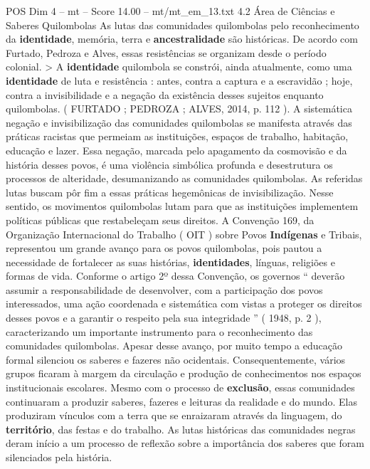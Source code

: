 \begin{textsample}{POS Dim 4 – mt – Score 14.00 – mt/mt\_em\_13.txt}  \label{ex:f4_pos_173}
4.2 Área de Ciências e Saberes Quilombolas As lutas das comunidades quilombolas pelo reconhecimento da \textbf{identidade}, memória, terra e \textbf{ancestralidade} são históricas.
De acordo com Furtado, Pedroza e Alves, essas resistências se organizam desde o período colonial. > A \textbf{identidade} quilombola se constrói, ainda atualmente, como uma \textbf{identidade} de luta e resistência : antes, contra a captura e a escravidão ; hoje, contra a invisibilidade e a negação da existência desses sujeitos enquanto quilombolas. ( FURTADO ; PEDROZA ; ALVES, 2014, p. 112 ).
A sistemática negação e invisibilização das comunidades quilombolas se manifesta através das práticas racistas que permeiam as instituições, espaços de trabalho, habitação, educação e lazer.
Essa negação, marcada pelo apagamento da cosmovisão e da história desses povos, é uma violência simbólica profunda e desestrutura os processos de alteridade, desumanizando as comunidades quilombolas.
As referidas lutas buscam pôr fim a essas práticas hegemônicas de invisibilização.
Nesse sentido, os movimentos quilombolas lutam para que as instituições implementem políticas públicas que restabeleçam seus direitos.
A Convenção 169, da Organização Internacional do Trabalho ( OIT ) sobre Povos \textbf{Indígenas} e Tribais, representou um grande avanço para os povos quilombolas, pois pautou a necessidade de fortalecer as suas histórias, \textbf{identidades}, línguas, religiões e formas de vida.
Conforme o artigo 2º dessa Convenção, os governos “ deverão assumir a responsabilidade de desenvolver, com a participação dos povos interessados, uma ação coordenada e sistemática com vistas a proteger os direitos desses povos e a garantir o respeito pela sua integridade ” ( 1948, p. 2 ), caracterizando um importante instrumento para o reconhecimento das comunidades quilombolas.
Apesar desse avanço, por muito tempo a educação formal silenciou os saberes e fazeres não ocidentais.
Consequentemente, vários grupos ficaram à margem da circulação e produção de conhecimentos nos espaços institucionais escolares.
Mesmo com o processo de \textbf{exclusão}, essas comunidades continuaram a produzir saberes, fazeres e leituras da realidade e do mundo.
Elas produziram vínculos com a terra que se enraizaram através da linguagem, do \textbf{território}, das festas e do trabalho.
As lutas históricas das comunidades negras deram início a um processo de reflexão sobre a importância dos saberes que foram silenciados pela história.

\end{textsample}
